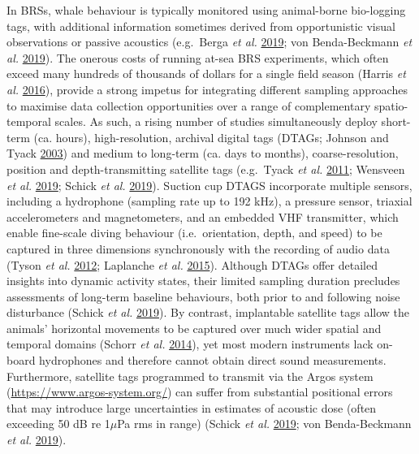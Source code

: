 \documentclass[
]{article}
\begin{document}
In BRSs, whale behaviour is typically monitored using animal-borne bio-logging tags, with additional information sometimes derived from opportunistic visual observations or passive acoustics (e.g.~Berga \emph{et al.} \protect\hyperlink{ref-Berga2019}{2019}; von Benda-Beckmann \emph{et al.} \protect\hyperlink{ref-vonBendaBeckmann2019}{2019}). The onerous costs of running at-sea BRS experiments, which often exceed many hundreds of thousands of dollars for a single field season (Harris \emph{et al.} \protect\hyperlink{ref-Harris2016}{2016}), provide a strong impetus for integrating different sampling approaches to maximise data collection opportunities over a range of complementary spatio-temporal scales. As such, a rising number of studies simultaneously deploy short-term (ca. hours), high-resolution, archival digital tags (DTAGs; Johnson and Tyack \protect\hyperlink{ref-Johnson2003}{2003}) and medium to long-term (ca. days to months), coarse-resolution, position and depth-transmitting satellite tags (e.g.~Tyack \emph{et al.} \protect\hyperlink{ref-Tyack2011}{2011}; Wensveen \emph{et al.} \protect\hyperlink{ref-Wensveen2019}{2019}; Schick \emph{et al.} \protect\hyperlink{ref-Schick2019}{2019}). Suction cup DTAGS incorporate multiple sensors, including a hydrophone (sampling rate up to 192 kHz), a pressure sensor, triaxial accelerometers and magnetometers, and an embedded VHF transmitter, which enable fine-scale diving behaviour (i.e.~orientation, depth, and speed) to be captured in three dimensions synchronously with the recording of audio data (Tyson \emph{et al.} \protect\hyperlink{ref-Tyson2012}{2012}; Laplanche \emph{et al.} \protect\hyperlink{ref-Laplanche2015}{2015}). Although DTAGs offer detailed insights into dynamic activity states, their limited sampling duration precludes assessments of long-term baseline behaviours, both prior to and following noise disturbance (Schick \emph{et al.} \protect\hyperlink{ref-Schick2019}{2019}). By contrast, implantable satellite tags allow the animals' horizontal movements to be captured over much wider spatial and temporal domains (Schorr \emph{et al.} \protect\hyperlink{ref-Schorr2014}{2014}), yet most modern instruments lack on-board hydrophones and therefore cannot obtain direct sound measurements. Furthermore, satellite tags programmed to transmit via the Argos system (\url{https://www.argos-system.org/}) can suffer from substantial positional errors that may introduce large uncertainties in estimates of acoustic dose (often exceeding 50 dB re 1\(\mu\)Pa rms in range) (Schick \emph{et al.} \protect\hyperlink{ref-Schick2019}{2019}; von Benda-Beckmann \emph{et al.} \protect\hyperlink{ref-vonBendaBeckmann2019}{2019}).
\end{document}
